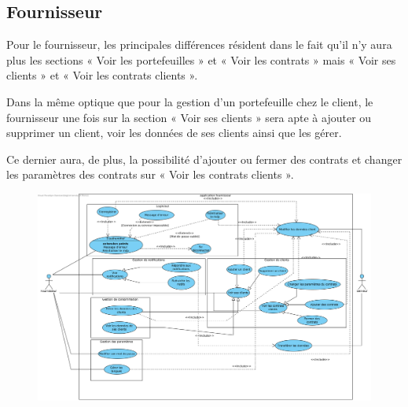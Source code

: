 \newpage

\subsection{Fournisseur}

\begin{flushleft}
Pour le fournisseur, les principales différences résident dans le fait qu’il n’y aura plus les sections « Voir les portefeuilles » et « Voir les contrats » mais « Voir ses clients » et « Voir les contrats clients ».
\end{flushleft}

\begin{flushleft}
Dans la même optique que pour la gestion d’un portefeuille chez le client, le fournisseur une fois sur la section « Voir ses clients » sera apte à ajouter ou supprimer un client, voir les données de ses clients ainsi que les gérer.
\end{flushleft}

\begin{flushleft}
Ce dernier aura, de plus, la possibilité d’ajouter ou fermer des contrats et changer les paramètres des contrats sur « Voir les contrats clients ».
\end{flushleft}

\begin{figure}[h]
\centering
\includegraphics[width = 1\textwidth]{use_case/fournisseur.png}
\end{figure}
